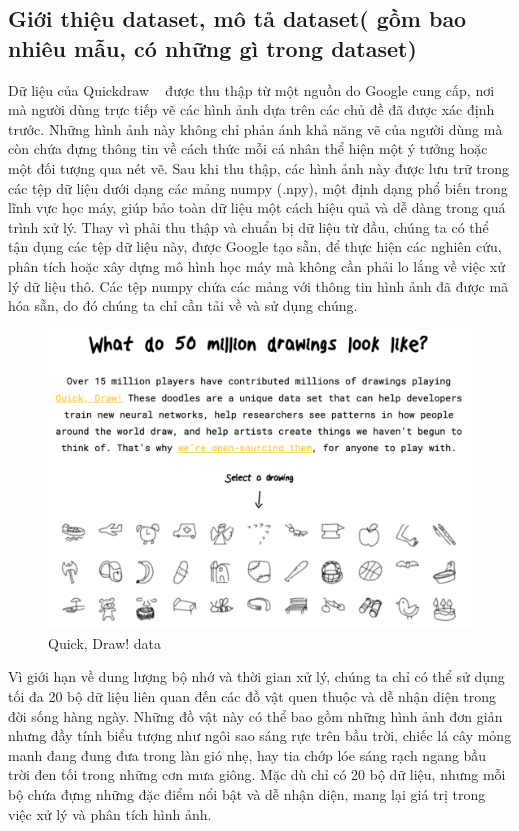 \begin{itemize}

\subsection{ Giới thiệu dataset, mô tả dataset( gồm bao nhiêu mẫu, có những gì trong dataset)}

    Dữ liệu của Quickdraw ~\cite{experiment} được thu thập từ một nguồn do Google cung cấp, nơi mà người dùng trực tiếp vẽ các hình ảnh dựa trên các chủ đề đã được xác định trước. Những hình ảnh này không chỉ phản ánh khả năng vẽ của người dùng mà còn chứa đựng thông tin về cách thức mỗi cá nhân thể hiện một ý tưởng hoặc một đối tượng qua nét vẽ. Sau khi thu thập, các hình ảnh này được lưu trữ trong các tệp dữ liệu dưới dạng các mảng numpy (.npy), một định dạng phổ biến trong lĩnh vực học máy, giúp bảo toàn dữ liệu một cách hiệu quả và dễ dàng trong quá trình xử lý. Thay vì phải thu thập và chuẩn bị dữ liệu từ đầu, chúng ta có thể tận dụng các tệp dữ liệu này, được Google tạo sẵn, để thực hiện các nghiên cứu, phân tích hoặc xây dựng mô hình học máy mà không cần phải lo lắng về việc xử lý dữ liệu thô. Các tệp numpy chứa các mảng với thông tin hình ảnh đã được mã hóa sẵn, do đó chúng ta chỉ cần tải về và sử dụng chúng.

\begin{figure}[H]  %
\centering
\includegraphics[width=0.75\linewidth]{Chapter2/QD2.png}
\caption{Quick, Draw! data}
\label{fig:baitoan}
\end{figure}

Vì giới hạn về dung lượng bộ nhớ và thời gian xử lý, chúng ta chỉ có thể sử dụng tối đa 20 bộ dữ liệu liên quan đến các đồ vật quen thuộc và dễ nhận diện trong đời sống hàng ngày. Những đồ vật này có thể bao gồm những hình ảnh đơn giản nhưng đầy tính biểu tượng như ngôi sao sáng rực trên bầu trời, chiếc lá cây mỏng manh đang đung đưa trong làn gió nhẹ, hay tia chớp lóe sáng rạch ngang bầu trời đen tối trong những cơn mưa giông. Mặc dù chỉ có 20 bộ dữ liệu, nhưng mỗi bộ chứa đựng những đặc điểm nổi bật và dễ nhận diện, mang lại giá trị trong việc xử lý và phân tích hình ảnh.


\end{itemize}
